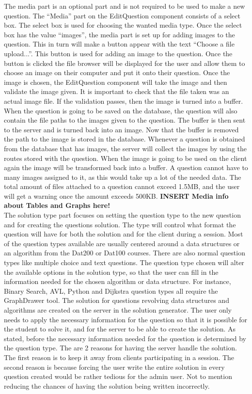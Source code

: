 The media part is an optional part and is not required to be used to make a new question. The “Media” part on the EditQuestion component consists of a select box. The select box is used for choosing the wanted media type. Once the select box has the value “images”, the media part is set up for adding images to the question. This in turn will make a button appear with the text “Choose a file upload...”. This button is used for adding an image to the question. Once the button is clicked the file browser will be displayed for the user and allow them to choose an image on their computer and put it onto their question. Once the image is chosen, the EditQuestion component will take the image and then validate the image given. It is important to check that the file taken was an actual image file. If the validation passes, then the image is turned into a buffer. When the question is going to be saved on the database, the question will also contain the file paths to the images given to the question. The buffer is then sent to the server and is turned back into an image. Now that the buffer is removed the path to the image is stored in the database. Whenever a question is obtained from the database that has images, the server will collect the images by using the routes stored with the question. When the image is going to be used on the client again the image will be transformed back into a buffer. A question cannot have to many images assigned to it, as this would take up a lot of the needed data. The total amount of files attached to a question cannot exceed 1.5MB, and the user will get a warning once the amount exceeds 500KB.
\textbf{INSERT Media info about Tables and Graphs here!}
\\[11pt]
The solution type part focuses on setting the question type to the new question and for creating the questions solution. The type will control what format the question will have for both the solution and for the client during a session. Most of the question types available are usually centered around a data structures or an algorithm from the Dat200 or Dat100 courses. There are also normal question types like multiple choice and text questions. The question type chosen will alter the available options in the solution type, so that the user can fill in the information needed for the chosen algorithm or data structure. For instance, Binary Search, AVL, Python and Dijkstra question types all require the GraphDrawer tool. The solution for questions revolving data structures and algorithms are created on the server in the solution generator. The user only needs to apply the necessary information for the question so that it is possible for the student to solve it, and for the server to be able to create the solution. As stated, before the necessary information needed for the question is determined by the question type. The are 2 reasons for having the server handle the solution. The first reason is to keep it away from clients participating in a session. The second reason is because forcing the user write the entire solution in every question created would be rather tedious for the admin user. Not to mention reducing the chances of having the solution being written incorrectly.
